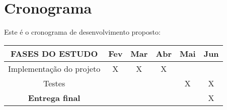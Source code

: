 %
%

\chapter{Cronograma}

Este é o cronograma de desenvolvimento proposto:

\begin{samepage}
\begin{tabular}{|c|c|c|c|c|c|}
\hline
FASES DO ESTUDO & Fev & Mar & Abr & Mai & Jun \\
\hline
Implementação do projeto & X & X & X & & \\
\hline
Testes &   &   &   & X & X \\
\hline
\textbf{Entrega final} &   &   &   &   & X \\
\hline
\end{tabular}
\end{samepage}
